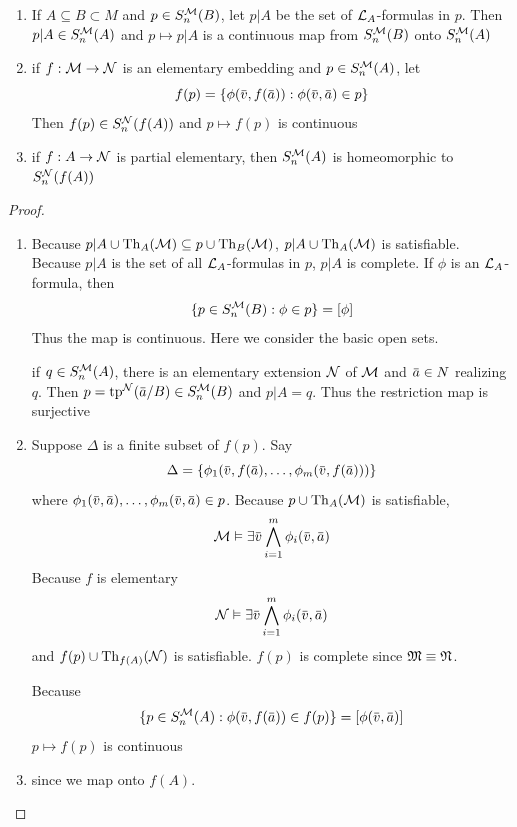 \documentclass[11pt]{article}
\begin{document}
\begin{lemma}[]
\label{lemma4.1.9}
\begin{enumerate}
\item If \(A\subseteq B\subset M\) and \(p\in S_n^{\mathcal{M}}(B)\), let \(p|A\) be  the set of \(\mathcal{L}_A\)-formulas in \(p\).
Then \(p|A\in S_n^{\mathcal{M}}(A)\) and \(p\mapsto p|A\) is a continuous map from \(S_n^{\mathcal{M}}(B)\) onto \(S_n^{\mathcal{M}}(A)\)
\item if \(f:\mathcal{M}\to\mathcal{N}\) is an elementary embedding and \(p\in S_n^{\mathcal{M}}(A)\), let
\begin{equation*}
f(p)=\{\phi(\barv,f(\bara)):\phi(\barv,\bara)\in p\}
\end{equation*}
Then \(f(p)\in S_n^{\mathcal{N}}(f(A))\) and \(p\mapsto f(p)\) is continuous
\item if \(f:A\to\mathcal{N}\) is partial elementary, then \(S_n^{\mathcal{M}}(A)\) is homeomorphic to \(S_n^{\mathcal{N}}(f(A))\)
\end{enumerate}
\end{lemma}

\begin{proof}
\begin{enumerate}
\item Because \(p|A\cup\operatorname{Th}_A(\mathcal{M})\subseteq p\cup\operatorname{Th}_B(\mathcal{M})\), \(p|A\cup\operatorname{Th}_A(\mathcal{M})\) is satisfiable.  Because \(p|A\) is
the set of all \(\mathcal{L}_A\)-formulas in \(p\), \(p|A\) is complete. If \(\phi\) is an \(\mathcal{L}_A\)-formula,
then
\begin{equation*}
\{p\in S_n^{\mathcal{M}}(B):\phi\in p\}=[\phi]
\end{equation*}
Thus the map is continuous. Here we consider the basic open sets.

if \(q\in S_n^{\mathcal{M}}(A)\), there is an elementary extension \(\mathcal{N}\) of \(\mathcal{M}\) and \(\bara\in N\)
realizing \(q\). Then \(p=\tp^{\caln}(\bara/B)\in S_n^{\calm}(B)\) and \(p|A=q\). Thus the restriction
map is surjective

\item Suppose \(\Delta\) is a finite subset of \(f(p)\). Say
\begin{equation*}
\Delta=\{\phi_1(\barv,f(\bara),\dots,\phi_m(\barv,f(\bara)))\}
\end{equation*}
where \(\phi_1(\barv,\bara),\dots,\phi_m(\barv,\bara)\in p\). Because \(p\cup\operatorname{Th}_A(\mathcal{M})\) is satisfiable,
\begin{equation*}
\calm\vDash\exists\barv\bigwedge_{i=1}^m\phi_i(\barv,\bara)
\end{equation*}
Because \(f\) is elementary
\begin{equation*}
\caln\vDash\exists\barv\bigwedge_{i=1}^m\phi_i(\barv,\bara)
\end{equation*}
and \(f(p)\cup\operatorname{Th}_{f(A)}(\mathcal{N})\) is satisfiable. \(f(p)\) is complete since \(\mathfrak{M}\equiv\mathfrak{N}\).

Because
\begin{equation*}
\{p\in S_n^{\calm}(A):\phi(\barv,f(\bara))\in f(p)\}=[\phi(\barv,\bara)]
\end{equation*}
\(p\mapsto f(p)\) is continuous

\item since we map onto \(f(A)\).
\end{enumerate}
\end{proof}
\end{document}
